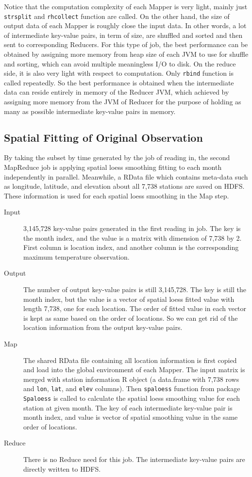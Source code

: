 Notice that the computation complexity of each Mapper is very light, mainly just
\texttt{strsplit} and \texttt{rhcollect} function are called. On the other hand,
the size of output data of each Mapper is roughly close the input data. In other
words, a lot of intermediate key-value pairs, in term of size, are shuffled and
sorted and then sent to corresponding Reducers. For this type of job, the best 
performance can be obtained by assigning more memory from heap size of each JVM 
to use for shuffle and sorting, which can avoid multiple meaningless I/O to disk.  
On the reduce side, it is also very light with respect to computation. Only 
\texttt{rbind} function is called repeatedly. So the best performance is obtained 
when the intermediate data can reside entirely in memory of the Reducer JVM, 
which achieved by assigning more memory from the JVM of Reducer for the purpose
of holding as many as possible intermediate key-value pairs in memory. 

\subsection{Spatial Fitting of Original Observation}

By taking the subset by time generated by the job of reading in, the second 
MapReduce job is applying spatial loess smoothing fitting to each month 
independently in parallel. Meanwhile, a RData file which contains meta-data such
as longitude, latitude, and elevation about all 7,738 stations are saved on HDFS.
These information is used for each spatial loess smoothing in the Map step. 

\begin{description}
  \item[Input] 3,145,728 key-value pairs generated in the first reading in job.
  The key is the month index, and the value is a matrix with dimension of 7,738
  by 2. First column is location index, and another column is the corresponding 
  maximum temperature observation.
  \item[Output] The number of output key-value pairs is still 3,145,728. The key
  is still the month index, but the value is a vector of spatial loess fitted
  value with length 7,738, one for each location. The order of fitted value in 
  each vector is kept as same based on the order of locations. So we can get rid
  of the location information from the output key-value pairs.
  \item[Map] The shared RData file containing all location information is first 
  copied and load into the global environment of each Mapper. The input matrix
  is merged with station information R object (a data.frame with 7,738 rows and
  \texttt{lon}, \texttt{lat}, and \texttt{elev} columns). Then \texttt{spaloess}
  function from package \texttt{Spaloess} is called to calculate the spatial
  loess smoothing value for each station at given month. The key of each 
  intermediate key-value pair is month index, and value is vector of spatial 
  smoothing value in the same order of locations. 
  \item[Reduce] There is no Reduce need for this job. The intermediate key-value
  pairs are directly written to HDFS.
\end{description}

